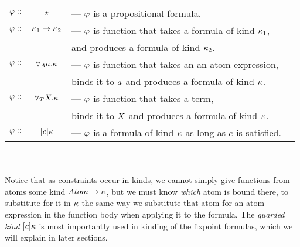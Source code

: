 \documentclass[english, mgr]{iithesis}
\begin{document}
\begin{tabular}{rclr}
$\varphi ::$ & $\star$ & ---  $\varphi$ is a propositional formula. \\
$\varphi ::$ & $\kappa_1 \to \kappa_2$ & ---  $\varphi$ is function that takes a formula of kind $\kappa_1$, \\
  & &  and produces a formula of kind $\kappa_2$. \\
$\varphi ::$ & $\forall_A a . \kappa$ & ---  $\varphi$ is function that takes an an atom expression, \\
  & &  binds it to $a$ and produces a formula of kind $\kappa$.\\
$\varphi ::$ & $\forall_T X . \kappa$ & ---  $\varphi$ is function that takes a term, \\
  & &  binds it to $X$ and produces a formula of kind $\kappa$.\\
$\varphi ::$ & $[c] \kappa$ & ---  $\varphi$ is a formula of kind $\kappa$ as long as $c$ is satisfied.
\end{tabular}
\\ \\
Notice that as constraints occur in kinds, we cannot simply give functions
from atoms some kind ${Atom}\to\kappa$, but we must know \textit{which} atom
is bound there, to substitute for it in $\kappa$ the same way we substitute
that atom for an atom expression in the function body when applying it to the formula.
The \textit{guarded kind} $[c] \kappa$ is most importantly used in
kinding of the fixpoint formulas, which we will explain in later sections.
\end{document}
